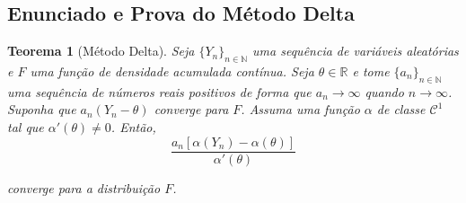 \documentclass{article}
\newtheorem{theorem}{Teorema}
\begin{document}
\subsection*{Enunciado e Prova do Método Delta}

\begin{theorem}[Método Delta]
    Seja $\{Y_n\}_{n\in \mathbb{N}}$ uma sequência de variáveis aleatórias e $F$ uma função de densidade acumulada contínua. Seja $\theta \in \mathbb{R}$ e tome $\{a_n\}_{n\in \mathbb{N}}$ uma sequência de números reais positivos de forma que $a_n \to \infty$ quando $n \to \infty$. Suponha que $a_n(Y_n - \theta)$ converge para $F$. Assuma uma função $\alpha$ de classe $\mathcal{C}^1$ tal que $\alpha'(\theta)\neq 0$. Então,
    \[\dfrac{a_n[\alpha(Y_n) - \alpha(\theta)]}{\alpha'(\theta)}\]
    
    \noindent converge para a distribuição $F$.
\end{theorem}
\end{document}
